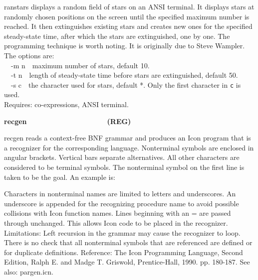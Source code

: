 \textsf{ranstars} displays a random field of
{\textquotedbl}stars{\textquotedbl} on an ANSI terminal. It displays
stars at randomly chosen positions on the screen until
the specified maximum number is reached. It then extinguishes existing
stars and creates new ones for the specified steady-state time, after
which the stars are extinguished, one by one. The programming technique
is worth noting. It is originally due to Steve Wampler. The options
are:\\
\ \ \textsf{{}-m n}\ \ maximum number of stars, default 10.\\
\ \ \textsf{{}-t n}\ \ length of steady-state time before stars are
extinguished, default 50.\\
\ \ \textsf{{}-s c}\ \ the character used for
{\textquotedbl}stars{\textquotedbl}, default *. Only the first
character in \texttt{c} is used.\\
Requires: co-expressions, ANSI terminal.

{\sffamily\bfseries
recgen\ \ \ \ \ \ \ \ \ \ \ \ \ \ \ \ \ \ \ \ (REG)}

\textsf{recgen} reads a context-free BNF grammar and produces
an Icon program that is a recognizer for the corresponding language.
Nonterminal symbols are enclosed in angular brackets. Vertical bars
separate alternatives. All other characters are considered to be
terminal symbols. The nonterminal symbol on the first line is taken to
be the goal. An example is:


Characters in nonterminal names are limited to letters and underscores.
An underscore is appended for the recognizing procedure name to avoid
possible collisions with Icon function names. Lines beginning with an =
are passed through unchanged. This allows Icon code to be placed in the
recognizer. Limitations: Left recursion in the grammar
may cause the recognizer to loop. There is no check that all
nonterminal symbols that are referenced are defined or for duplicate
definitions. Reference: The Icon Programming Language, Second Edition,
Ralph E. and Madge T. Griswold, Prentice-Hall, 1990. pp. 180-187. See
also: \textsf{pargen.icn}.

